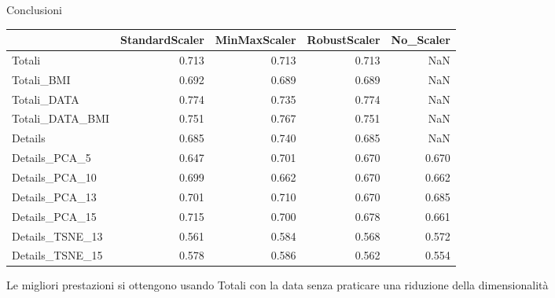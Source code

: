\documentclass{beamer}
\begin{document}
\begin{frame}{Conclusioni}
	\begin{block}{}
		\begin{center}
			\begin{adjustbox}{max width=\textwidth}
				\begin{tabular}{lrrrr}
					\toprule
					{} &  StandardScaler &  MinMaxScaler &  RobustScaler &  No\_Scaler \\
					\midrule
					Totali                     &        0.713 &      0.713 &      0.713 &        NaN \\
					Totali\_BMI            &        0.692 &      0.689 &      0.689 &        NaN \\
					Totali\_DATA           &        \cellcolor{blue!25}0.774 &      0.735 &      \cellcolor{blue!25}0.774 &        NaN \\
					Totali\_DATA\_BMI   &        0.751 &      0.767 &      0.751 &        NaN \\
					Details                    &        0.685 &      0.740 &      0.685 &        NaN \\
					Details\_PCA\_5   &        0.647 &      0.701 &      0.670 &   0.670 \\
					Details\_PCA\_10  &        0.699 &      0.662 &      0.670 &   0.662 \\
					Details\_PCA\_13  &        0.701 &      0.710 &      0.670 &   0.685 \\
					Details\_PCA\_15  &        0.715 &      0.700 &      0.678 &   0.661 \\
					Details\_TSNE\_13 &        0.561 &      0.584 &      0.568 &   0.572 \\
					Details\_TSNE\_15 &        0.578 &      0.586 &      0.562 &   0.554 \\
					\bottomrule
				\end{tabular}
			\end{adjustbox}
		\end{center}
	\end{block}
	Le migliori prestazioni si ottengono usando Totali con la data senza praticare una riduzione della dimensionalità
\end{frame}
\end{document}
